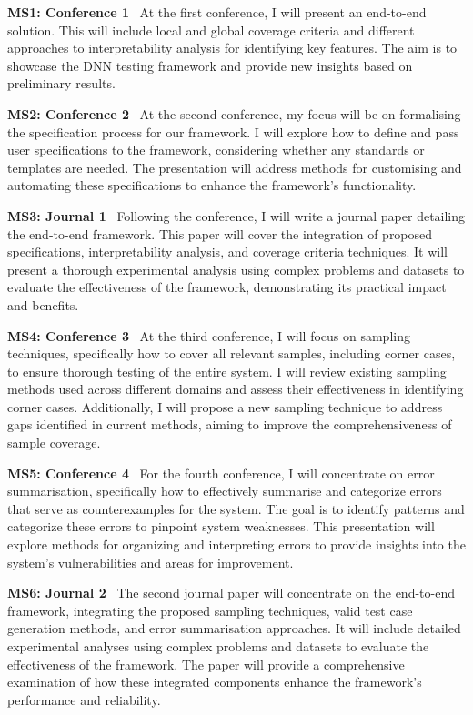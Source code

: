 \noindent \textbf{MS1: Conference 1} \
At the first conference, I will present an end-to-end solution. This will include local and global coverage criteria and different approaches to interpretability analysis for identifying key features. The aim is to showcase the DNN  testing framework and provide new insights based on preliminary results.

\noindent \textbf{MS2: Conference 2} \
At the second conference, my focus will be on formalising the specification process for our framework. I will explore how to define and pass user specifications to the framework, considering whether any standards or templates are needed. The presentation will address methods for customising and automating these specifications to enhance the framework’s functionality.

\noindent \textbf{MS3: Journal 1} \
Following the conference, I will write a journal paper detailing the end-to-end framework. This paper will cover the integration of proposed specifications, interpretability analysis, and coverage criteria techniques. It will present a thorough experimental analysis using complex problems and datasets to evaluate the effectiveness of the framework, demonstrating its practical impact and benefits.

\noindent \textbf{MS4: Conference 3} \
At the third conference, I will focus on sampling techniques, specifically how to cover all relevant samples, including corner cases, to ensure thorough testing of the entire system. I will review existing sampling methods used across different domains and assess their effectiveness in identifying corner cases. Additionally, I will propose a new sampling technique to address gaps identified in current methods, aiming to improve the comprehensiveness of sample coverage.

\noindent \textbf{MS5: Conference 4} \
For the fourth conference, I will concentrate on error summarisation, specifically how to effectively summarise and categorize errors that serve as counterexamples for the system. The goal is to identify patterns and categorize these errors to pinpoint system weaknesses. This presentation will explore methods for organizing and interpreting errors to provide insights into the system's vulnerabilities and areas for improvement.

\noindent \textbf{MS6: Journal 2 } \
The second journal paper will concentrate on the end-to-end framework, integrating the proposed sampling techniques, valid test case generation methods, and error summarisation approaches. It will include detailed experimental analyses using complex problems and datasets to evaluate the effectiveness of the framework. The paper will provide a comprehensive examination of how these integrated components enhance the framework's performance and reliability.

